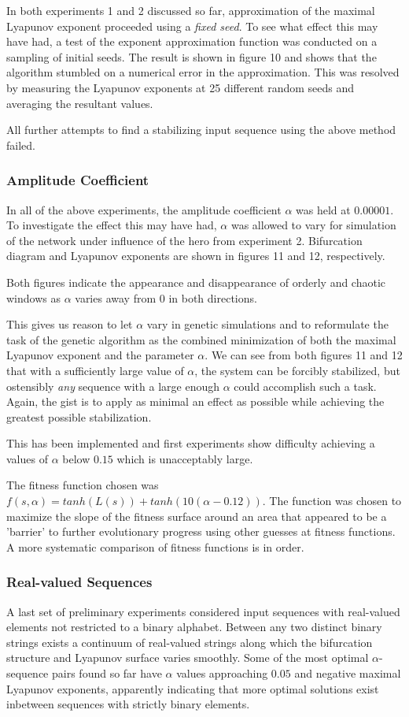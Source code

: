 \documentclass[12pt]{article}
\begin{document}
In both experiments 1 and 2 discussed so far, approximation of the maximal
Lyapunov exponent proceeded using a \textit{fixed seed}.  To see what effect
this may have had, a test of the exponent approximation function was conducted
on a sampling of initial seeds.  The result is shown in figure 10 and shows
that the algorithm stumbled on a numerical error in the approximation.
This was resolved by measuring the Lyapunov exponents at 25 different random
seeds and averaging the resultant values.

All further attempts to find a stabilizing input sequence using the above
method failed.

\subsubsection{Amplitude Coefficient}
In all of the above experiments, the amplitude coefficient $\alpha$ was
held at $0.00001$.  To investigate the effect this may have had, $\alpha$
was allowed to vary for simulation of the network under influence of the
hero from experiment 2.  Bifurcation diagram and Lyapunov exponents are
shown in figures 11 and 12, respectively.

Both figures indicate the appearance and disappearance of orderly and chaotic
windows as $\alpha$ varies away from $0$ in both directions.

This gives us reason to let $\alpha$ vary in genetic simulations and to
reformulate the task of the genetic algorithm as the combined minimization of
both the maximal Lyapunov exponent and the parameter $\alpha$.  We can see
from both figures 11 and 12 that with a sufficiently large value of $\alpha$,
the system can be forcibly stabilized, but ostensibly \textit{any} sequence
with a large enough $\alpha$ could accomplish such a task.  Again, the gist
is to apply as minimal an effect as possible while achieving the greatest
possible stabilization.

This has been implemented and first experiments show difficulty achieving a
values of $\alpha$ below $0.15$ which is unacceptably large.

The fitness function chosen was
$f(s, \alpha) = tanh(L(s)) + tanh(10(\alpha-0.12))$.  The function
was chosen to maximize the slope of the fitness surface around an area
that appeared to be a 'barrier' to further evolutionary progress using other
guesses at fitness functions.  A more systematic comparison of fitness
functions is in order.

\subsubsection{Real-valued Sequences}
A last set of preliminary experiments considered input sequences with
real-valued elements not restricted to a binary alphabet.  Between any two
distinct binary strings exists a continuum of real-valued strings along which
the bifurcation structure and Lyapunov surface varies smoothly.  Some of the
most optimal $\alpha$-sequence pairs found so far have $\alpha$ values
approaching $0.05$ and negative maximal Lyapunov exponents, apparently
indicating that more optimal solutions exist inbetween sequences with
strictly binary elements.
\end{document}
